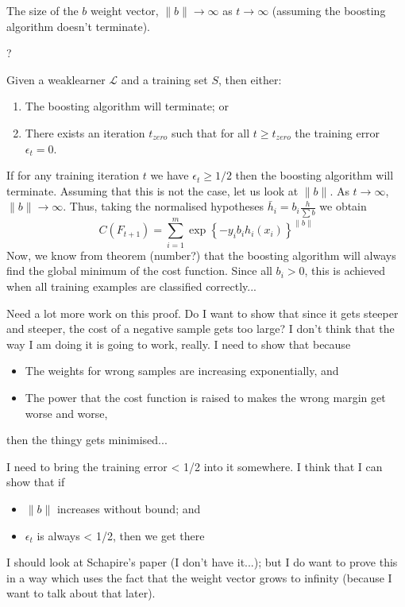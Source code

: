\begin{theorem}
The size of the $b$ weight vector, $\|b\| \rightarrow \infty$
as $t \rightarrow \infty$ (assuming the boosting algorithm doesn't
terminate).

\proof ?
\end{theorem}

\begin{theorem}
Given a weaklearner $\mathcal{L}$ and a training set $S$,
then either:
\begin{enumerate}
\item	The boosting algorithm will terminate; or
\item	There exists an iteration $t_{zero}$ such that for all $t \geq
	t_{zero}$ the training error $\epsilon_t = 0$.
\end{enumerate}

\proof If for any training iteration $t$ we have $\epsilon_t \geq 1/2$
then the boosting algorithm will terminate.  Assuming that this is not the
case, let us look at $\|b\|$.  As $t \rightarrow \infty$, $\|b\|
\rightarrow \infty$.  Thus, taking the normalised hypotheses $\bar{h}_i
= b_i \frac{h}{\sum b}$ we obtain
\[
C(F_{t+1}) = \sum_{i=1}^{m} \exp\left\{ -y_i b_i h_i(x_i)
\right\}^{\|b\|}
\]
Now, we know from theorem (number?) that the boosting algorithm will
always find the global minimum of the cost function.  Since all $b_i >
0$, this is achieved when all training examples are classified
correctly...

Need a lot more work on this proof.  Do I want to show that since it
gets steeper and steeper, the cost of a negative sample gets too
large?  I don't think that the way I am doing it is going to work,
really.  I need to show that because
\begin{itemize}
\item	The weights for wrong samples are increasing exponentially,
	and
\item	The power that the cost function is raised to makes the wrong
	margin get worse and worse,
\end{itemize}
then the thingy gets minimised...

I need to bring the training error < 1/2 into it somewhere.  I think
that I can show that if
\begin{itemize}
\item	$\|b\|$ increases without bound; and
\item	$\epsilon_t$ is always < 1/2, then we get there
\end{itemize}

I should look at Schapire's paper (I don't have it...); but I do want
to prove this in a way which uses the fact that the weight vector
grows to infinity (because I want to talk about that later).

\end{theorem}



